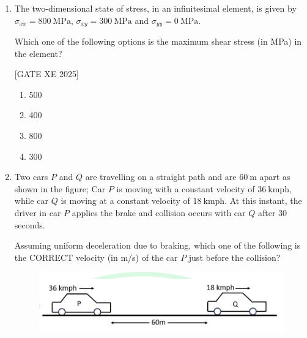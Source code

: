 \documentclass[journal,12pt,onecolumn]{IEEEtran}
\theoremstyle{remark}
\begin{document}
\begin{enumerate}
\hfill[GATE XE 2025]


\begin{multicols}{2}
\begin{enumerate}
\item 90
\item 60
\item 45
\item 120
\end{enumerate}
\end{multicols}

\item The two-dimensional state of stress, in an infinitesimal element, is given by $\sigma_{xx}=800~\text{MPa}$, $\sigma_{xy}=300~\text{MPa}$ and $\sigma_{yy}=0~\text{MPa}$.

Which one of the following options is the maximum shear stress (in MPa) in the element?


\hfill[GATE XE 2025]


\begin{multicols}{2}
\begin{enumerate}
\item 500
\item 400
\item 800
\item 300
\end{enumerate}
\end{multicols}

\item Two cars $P$ and $Q$ are travelling on a straight path and are $60~\text{m}$ apart as shown in the figure; Car $P$ is moving with a constant velocity of $36~\text{kmph}$, while car $Q$ is moving at a constant velocity of $18~\text{kmph}$. At this instant, the driver in car $P$ applies the brake and collision occurs with car $Q$ after $30$ seconds.

Assuming uniform deceleration due to braking, which one of the following is the CORRECT velocity (in m/s) of the car $P$ just before the collision?
\begin{figure}[H]
    \centering
    \includegraphics[width=0.5\columnwidth]{figs/fig17.png}
    \caption{}
    \label{fig:placeholder}
\end{figure}


\end{enumerate}
\end{document}
